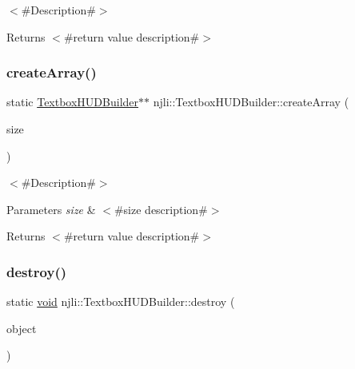 $<$\#\+Description\#$>$

\begin{DoxyReturn}{Returns}
$<$\#return value description\#$>$ 
\end{DoxyReturn}
\mbox{\label{classnjli_1_1_textbox_h_u_d_builder_a9bfdc5e1e870ef42663fd7d8a85bcfe7}} 
\subsubsection{\texorpdfstring{create\+Array()}{createArray()}}
{\footnotesize\ttfamily static \mbox{\hyperlink{classnjli_1_1_textbox_h_u_d_builder}{Textbox\+H\+U\+D\+Builder}}$\ast$$\ast$ njli\+::\+Textbox\+H\+U\+D\+Builder\+::create\+Array (\begin{DoxyParamCaption}\item[{const \mbox{\hyperlink{_util_8h_a10e94b422ef0c20dcdec20d31a1f5049}{u32}}}]{size }\end{DoxyParamCaption})\hspace{0.3cm}{\ttfamily [static]}}

$<$\#\+Description\#$>$


\begin{DoxyParams}{Parameters}
{\em size} & $<$\#size description\#$>$\\
\hline
\end{DoxyParams}
\begin{DoxyReturn}{Returns}
$<$\#return value description\#$>$ 
\end{DoxyReturn}
\mbox{\label{classnjli_1_1_textbox_h_u_d_builder_a51889c0d7cc39582491aa0a6773c896b}} 
\subsubsection{\texorpdfstring{destroy()}{destroy()}}
{\footnotesize\ttfamily static \mbox{\hyperlink{_thread_8h_af1e856da2e658414cb2456cb6f7ebc66}{void}} njli\+::\+Textbox\+H\+U\+D\+Builder\+::destroy (\begin{DoxyParamCaption}\item[{\mbox{\hyperlink{classnjli_1_1_textbox_h_u_d_builder}{Textbox\+H\+U\+D\+Builder}} $\ast$}]{object }\end{DoxyParamCaption})\hspace{0.3cm}{\ttfamily [static]}}

